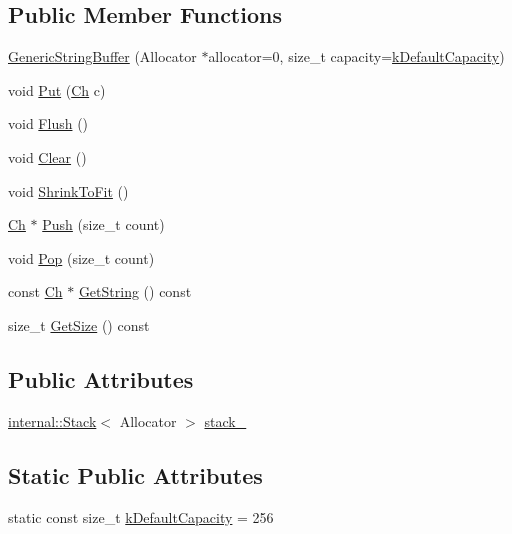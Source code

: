 \subsection*{Public Member Functions}
\begin{DoxyCompactItemize}
\item 
\hyperlink{classGenericStringBuffer_a62f5ea1a53a2a3f98088f8c152b6183e}{Generic\+String\+Buffer} (Allocator $\ast$allocator=0, size\+\_\+t capacity=\hyperlink{classGenericStringBuffer_ae74f9df854dd5a7db4315ef44b016d22}{k\+Default\+Capacity})
\item 
void \hyperlink{classGenericStringBuffer_a8be5c8fadccacdcf40e20220f38e0afa}{Put} (\hyperlink{classGenericStringBuffer_a735b75db076ffe86d0d294be49655d46}{Ch} c)
\item 
void \hyperlink{classGenericStringBuffer_a28bb539487db17b07314a532f3b8847c}{Flush} ()
\item 
void \hyperlink{classGenericStringBuffer_a42f15c959046d899cb74c3120a6995f9}{Clear} ()
\item 
void \hyperlink{classGenericStringBuffer_a0dbdb77489b95923795011a24f705be5}{Shrink\+To\+Fit} ()
\item 
\hyperlink{classGenericStringBuffer_a735b75db076ffe86d0d294be49655d46}{Ch} $\ast$ \hyperlink{classGenericStringBuffer_a49fd10cdd5dd97a4cf9813d01334d660}{Push} (size\+\_\+t count)
\item 
void \hyperlink{classGenericStringBuffer_a0038e53ba03c271bc4cbbac403ec4de4}{Pop} (size\+\_\+t count)
\item 
const \hyperlink{classGenericStringBuffer_a735b75db076ffe86d0d294be49655d46}{Ch} $\ast$ \hyperlink{classGenericStringBuffer_a42ed917a29012d932802f2709e11c572}{Get\+String} () const 
\item 
size\+\_\+t \hyperlink{classGenericStringBuffer_abd04725d776322157be3381f5559c40b}{Get\+Size} () const 
\end{DoxyCompactItemize}
\subsection*{Public Attributes}
\begin{DoxyCompactItemize}
\item 
\hyperlink{classinternal_1_1Stack}{internal\+::\+Stack}$<$ Allocator $>$ \hyperlink{classGenericStringBuffer_aaef716643febb9de5957dbf8ff904409}{stack\+\_\+}
\end{DoxyCompactItemize}
\subsection*{Static Public Attributes}
\begin{DoxyCompactItemize}
\item 
static const size\+\_\+t \hyperlink{classGenericStringBuffer_ae74f9df854dd5a7db4315ef44b016d22}{k\+Default\+Capacity} = 256
\end{DoxyCompactItemize}


